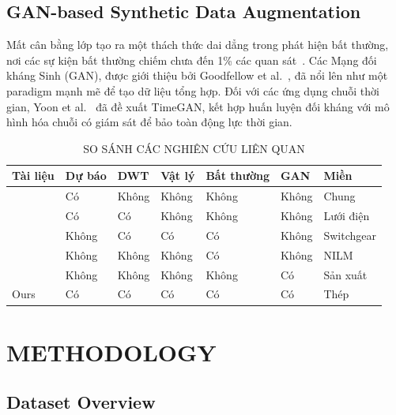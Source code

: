 \documentclass[conference]{IEEEtran}
\begin{document}
\subsection{GAN-based Synthetic Data Augmentation}

Mất cân bằng lớp tạo ra một thách thức dai dẳng trong phát hiện bất thường, nơi các sự kiện bất thường chiếm chưa đến 1\% các quan sát~\cite{chandola2009}. Các Mạng đối kháng Sinh (GAN), được giới thiệu bởi Goodfellow et al.~\cite{goodfellow2014}, đã nổi lên như một paradigm mạnh mẽ để tạo dữ liệu tổng hợp. Đối với các ứng dụng chuỗi thời gian, Yoon et al.~\cite{yoon2019} đã đề xuất TimeGAN, kết hợp huấn luyện đối kháng với mô hình hóa chuỗi có giám sát để bảo toàn động lực thời gian.

\begin{table}[htbp]
\caption{SO SÁNH CÁC NGHIÊN CỨU LIÊN QUAN}
\label{tab:related}
\centering
\small
\begin{tabular}{@{}p{2.2cm}p{2.0cm}p{1.0cm}p{1.1cm}p{1.5cm}p{1.0cm}p{2.2cm}@{}}
\toprule
Tài liệu & Dự báo & DWT & Vật lý & Bất thường & GAN & Miền \\
\midrule
\cite{hippert2001} & Có & Không & Không & Không & Không & Chung \\
\cite{zhang2024} & Có & Có & Không & Không & Không & Lưới điện \\
\cite{hoffmann2020switchgear} & Không & Có & Có & Có & Không & Switchgear \\
\cite{rashid2019nilm} & Không & Không & Không & Có & Không & NILM \\
\cite{tang2025} & Không & Không & Không & Không & Có & Sản xuất \\
Ours & Có & Có & Có & Có & Có & Thép \\
\bottomrule
\end{tabular}
\end{table}



\section{METHODOLOGY}
\label{sec:methodology}

\subsection{Dataset Overview}
\end{document}
